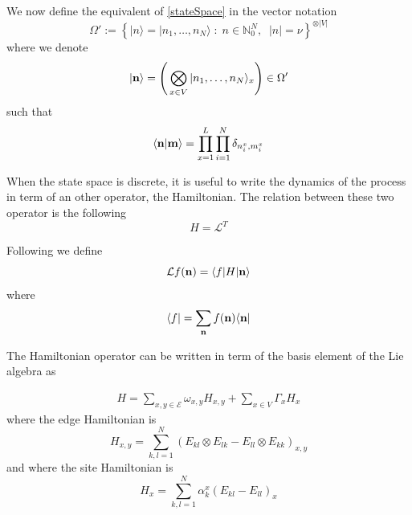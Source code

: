 \documentclass[11pt]{article}
\numberwithin{equation}{section}
\newcommand{\twoj}{\nu}
\begin{document}
We now define the equivalent of \eqref{stateSpace} in the vector notation
 \begin{equation}
	\Omega':=\left\{|n\rangle=|n_{1},\ldots,n_{N}\rangle \;:\;n\in\mathbb{N}_0^N,\;\;|n|=\twoj\right\}^{\otimes|V|}
	\end{equation}
where we denote 
\begin{equation}
|{\bf n}\rangle=\left(\,\bigotimes_{x\in V}	|n_{1},\ldots,n_{N}\rangle_{x}\right)\in \Omega'
\end{equation}
such that
\begin{equation}
    \langle {\bf n}|{\bf m}\rangle =\prod_{x=1}^L\prod_{i=1}^N\delta_{n^x_i,m^{x}_i}
\end{equation}


When the state space is discrete, it is useful to write the dynamics of the process in term of an other operator, the Hamiltonian. The relation between these two operator is the following
\begin{equation}
H=\mathcal{L}^{T}
\end{equation}




Following  \cite{belitsky2015self} we define
\begin{equation}
    \mathcal{L}f( {\bf n})=\langle f|H| {\bf n}\rangle
\end{equation}
where 
\begin{equation}
    \langle f|=\sum_{ {\bf n}}f( {\bf n})\langle  {\bf n}|
\end{equation}


The Hamiltonian operator can be written in term of the basis element of the Lie algebra as

\begin{equation}\label{OriginalHamiltonian}
	\begin{split}
		H=\sum_{x,y\in \mathcal{E}}\omega_{x,y}H_{x,y}+\sum_{x\in V}\Gamma_{x}H_{x}
	\end{split}
\end{equation}
where the edge Hamiltonian is
\begin{equation}\label{edgeHamiltonian}
H_{x,y}=\sum_{k,l=1}^{N}\left(E_{kl}\otimes E_{lk}-E_{ll}\otimes E_{kk}\right)_{x,y}
 \end{equation}
 and where the site Hamiltonian is
 \begin{equation}\label{siteHamiltonian}
H_{x}=\sum_{k,l=1}^{N}\alpha_{k}^{x}\left(E_{kl}-E_{ll}\right)_x
\end{equation}
\end{document}
